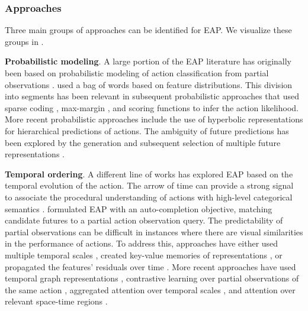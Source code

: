 \subsubsection{Approaches}

Three main groups of approaches can be identified for EAP. We visualize these groups in .

\noindent
\textbf{Probabilistic modeling}. A large portion of the EAP literature has originally been based on probabilistic modeling of action classification from partial observations \citep{cao2013recognize,hoai2014max,li2012modeling,li2014prediction,ryoo2011human}. \citet{ryoo2011human} used a bag of words based on feature distributions. This division into segments has been relevant in subsequent probabilistic approaches that used sparse coding \citep{cao2013recognize}, max-margin \citep{hoai2014max}, and scoring functions \citep{li2012modeling,li2014prediction} to infer the action likelihood. More recent probabilistic approaches include the use of hyperbolic representations \citep{suris2021learning} for hierarchical predictions of actions. The ambiguity of future predictions has been explored by the generation and subsequent selection of multiple future representations \citep{chen2022ambiguousness}.


\noindent
\textbf{Temporal ordering}. A different line of works has explored EAP based on the temporal evolution of the action. The arrow of time \citep{pickup2014seeing} can provide a strong signal to associate the procedural understanding of actions with high-level categorical semantics \citep{misra2016shuffle,zhou2015temporal}. \citet{xu2015activity} formulated EAP with an auto-completion objective, matching candidate futures to a partial action observation query. The predictability of partial observations can be difficult in instances where there are visual similarities in the performance of actions. To address this, approaches have either used multiple temporal scales \citep{kong2014discriminative}, created key-value memories of representations \citep{kong2018action}, or propagated the features' residuals over time \citep{zhao2019spatiotemporal}. More recent approaches have used temporal graph representations \citep{wu2021spatial,wu2021anticipating}, contrastive learning over partial observations of the same action \citep{wang2023magi}, aggregated attention over temporal scales \citep{stergiou2023wisdom}, and attention over relevant space-time regions \citep{rangrej2023glitr}.


